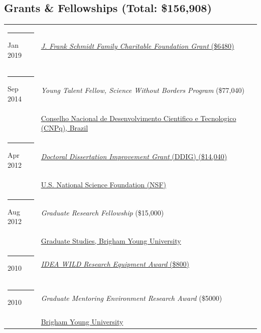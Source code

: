 \documentclass[margin,line]{res}
\begin{document}
\begin{resume}
\section{\sc Grants \& Fellowships (Total: \$156,908)}
\begin{longtable}{@{}p{0.7in}p{4in}}
\hspace*{-4mm} \rule{-1mm}{5mm} Jan 2019 & \href{https://www.jfschmidt.com/aboutjfs.html/}{\textit{J. Frank Schmidt Family Charitable Foundation Grant} (\$6480)}\\*
\hspace*{-4mm} \rule{-1mm}{5mm} Sep 2014 & {\textit{Young Talent Fellow, Science Without Borders Program} (\$77,040)}\\*
\hspace*{-4mm} \hspace*{-4mm} & \hspace{4mm} \href{http://www.cnpq.br}{Conselho Nacional de Desenvolvimento Cientifico e Tecnologico (CNPq), Brazil}\\
\hspace*{-4mm} \rule{-1mm}{5mm} Apr 2012 & \href{https://www.nsf.gov/publications/pub_summ.jsp?ods_key=nsf13568&org=NSF}{\textit{Doctoral Dissertation Improvement Grant} (DDIG) (\$14,040)}\\*
\hspace*{-4mm} \hspace*{-4mm} & \hspace{4mm} \href{https://www.nsf.gov}{U.S. National Science Foundation (NSF)}\\
\hspace*{-4mm} \rule{-1mm}{5mm} Aug 2012 & {\textit{Graduate Research Fellowship} (\$15,000)}\\*
\hspace*{-4mm} \hspace*{-4mm} & \hspace{4mm} \href{https://gradstudies.byu.edu/}{Graduate Studies, Brigham Young University}\\
\hspace*{-4mm} \rule{-1mm}{5mm} 2010 & \href{https://ideawild.org}{\textit{IDEA WILD Research Equipment Award} (\$800)}\\*
\hspace*{-4mm} \rule{-1mm}{5mm} 2010 & {\textit{Graduate Mentoring Environment Research Award} (\$5000)}\\*
\hspace*{-4mm} \hspace*{-4mm} & \hspace{4mm} \href{http://www.byu.edu/}{Brigham Young University}\\

\end{longtable}
\end{resume}
\end{document}
